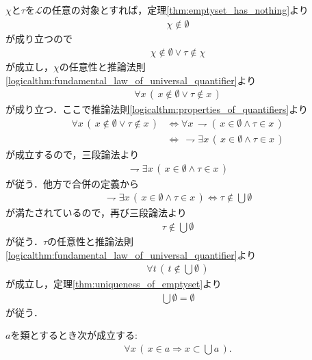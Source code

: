 	\begin{prf}
		$\chi$と$\tau$を$\mathcal{L}$の任意の対象とすれば，定理\ref{thm:emptyset_has_nothing}より
		\begin{align}
			\chi \notin \emptyset
		\end{align}
		が成り立つので
		\begin{align}
			\chi \notin \emptyset \vee \tau \notin \chi
		\end{align}
		が成立し，$\chi$の任意性と推論法則\ref{logicalthm:fundamental_law_of_universal_quantifier}より
		\begin{align}
			\forall x\, (\, x \notin \emptyset \vee \tau \notin x\, )
		\end{align}
		が成り立つ．ここで推論法則\ref{logicalthm:properties_of_quantifiers}より
		\begin{align}
			\forall x\, (\, x \notin \emptyset \vee \tau \notin x\, )
			&\Longleftrightarrow \forall x\, \rightharpoondown (\, x \in \emptyset \wedge \tau \in x\, ) \\
			&\Longleftrightarrow\, \rightharpoondown \exists x\, (\, x \in \emptyset \wedge \tau \in x\, )
		\end{align}
		が成立するので，三段論法より
		\begin{align}
			\rightharpoondown \exists x\, (\, x \in \emptyset \wedge \tau \in x\, )
		\end{align}
		が従う．他方で合併の定義から
		\begin{align}
			\rightharpoondown \exists x\, (\, x \in \emptyset \wedge \tau \in x\, )
			\Longleftrightarrow \tau \notin \bigcup \emptyset
		\end{align}
		が満たされているので，再び三段論法より
		\begin{align}
			\tau \notin \bigcup \emptyset
		\end{align}
		が従う．$\tau$の任意性と推論法則\ref{logicalthm:fundamental_law_of_universal_quantifier}より
		\begin{align}
			\forall t\, (\, t \notin \bigcup \emptyset\, )
		\end{align}
		が成立し，定理\ref{thm:uniqueness_of_emptyset}より
		\begin{align}
			\bigcup \emptyset = \emptyset
		\end{align}
		が従う．
		\QED
	\end{prf}
	
	\begin{screen}
		\begin{thm}[合併は任意の要素より大きい]\label{thm:union_is_bigger_than_any_member}
			$a$を類とするとき次が成立する:
			\begin{align}
				\forall x\, (\, x \in a \Longrightarrow x \subset \bigcup a\, ).
			\end{align}
		\end{thm}
	\end{screen}
	
